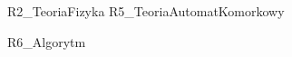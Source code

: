 \documentclass[pdflatex,11pt]{aghdpl}
\author{Dorota Wojtałow, Jacek Złydach}
\date{2010}
\begin{document}
\titlepages

\tableofcontents
\clearpage


 {R2_TeoriaFizyka}
 {R5_TeoriaAutomatKomorkowy}

 {R6_Algorytm}



% 
% 


\end{document}
